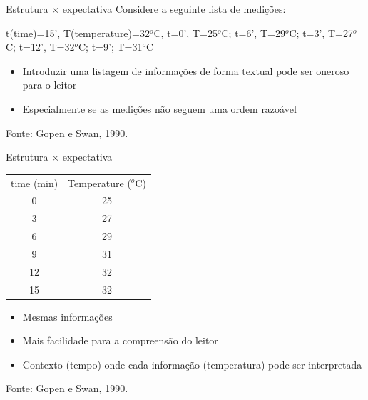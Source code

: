 \documentclass{beamer}
\begin{document}
\begin{frame}{Estrutura $\times$ expectativa}
  Considere a seguinte lista de medições:
  \begin{example}
    t(time)=15', T(temperature)=32$^o$C, t=0', T=25$^o$C; t=6',
    T=29$^o$C; t=3', T=27$^o$C; t=12', T=32$^o$C; t=9'; T=31$^o$C
  \end{example}

  \begin{itemize}
  \item Introduzir uma \alert{listagem} de informações de forma textual pode
    ser oneroso para o leitor
  \item Especialmente se as medições não seguem uma ordem razoável
  \end{itemize}
\vfill
  Fonte: Gopen e Swan, 1990.
\end{frame}

\begin{frame}{Estrutura $\times$ expectativa}
  \begin{example}
    \begin{tabular}{cc}
      time (min) & Temperature ($^o$C) \\
      0 & 25 \\
      3 & 27 \\
      6 & 29 \\
      9 & 31 \\
      12 & 32 \\
      15 & 32 \\
    \end{tabular}
  \end{example}
  \begin{itemize}
  \item<1-> Mesmas informações
  \item Mais facilidade para a compreensão do leitor
  \item \alert{Contexto} (tempo) onde cada \alert{informação}
    (temperatura) pode ser interpretada
  \end{itemize}
\vfill
  Fonte: Gopen e Swan, 1990.
\end{frame}
\end{document}
